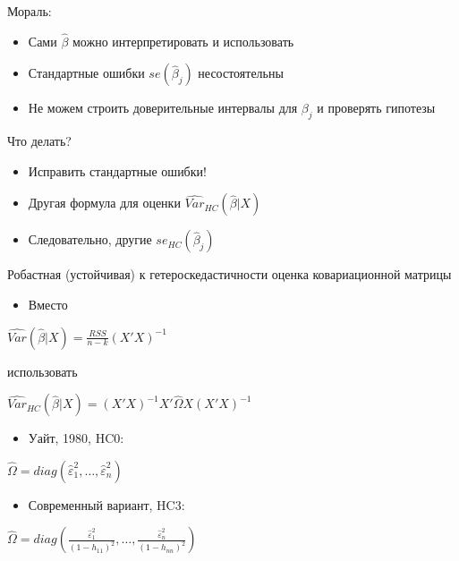 \documentclass[ignorenonframetext,]{beamer}
\begin{document}
\begin{frame}{Мораль:}

\begin{itemize}
\item
  Сами \(\hat{\beta}\) можно интерпретировать и использовать
\item
  Стандартные ошибки \(se(\hat{\beta}_j)\) несостоятельны
\item
  Не можем строить доверительные интервалы для \(\beta_j\) и проверять
  гипотезы
\end{itemize}

\end{frame}

\begin{frame}{Что делать?}

\begin{itemize}
\item
  Исправить стандартные ошибки!
\item
  Другая формула для оценки \(\widehat{Var}_{HC}(\hat{\beta}|X)\)
\item
  Следовательно, другие \(se_{HC}(\hat{\beta}_j)\)
\end{itemize}

\end{frame}

\begin{frame}{Робастная (устойчивая) к гетероскедастичности оценка
ковариационной матрицы}

\begin{itemize}
\itemsep1pt\parskip0pt
\item
  Вместо
\end{itemize}

\(\widehat{Var}(\hat{\beta}|X)=\frac{RSS}{n-k}(X'X)^{-1}\)

использовать

\(\widehat{Var}_{HC}(\hat{\beta}|X)=(X'X)^{-1}X'\hat{\Omega}X(X'X)^{-1}\)

\begin{itemize}
\itemsep1pt\parskip0pt
\item
  Уайт, 1980, HC0:
\end{itemize}

\(\hat{\Omega}=diag( \hat{\varepsilon}_1^2, \ldots, \hat{\varepsilon}_n^2 )\)

\begin{itemize}
\itemsep1pt\parskip0pt
\item
  Современный вариант, HC3:
\end{itemize}

\(\hat{\Omega}=diag \left( \frac{\hat{\varepsilon}_1^2}{(1-h_{11})^2}, \ldots, \frac{\hat{\varepsilon}_n^2}{(1-h_{nn})^2} \right)\)

\end{frame}
\end{document}
